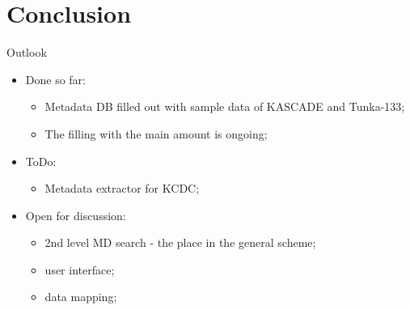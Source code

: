 \section{Conclusion}


\begin{frame}{Outlook}
\begin{itemize}
\item Done so far:
    \begin{itemize}
    \item Metadata DB filled out with sample data of KASCADE and Tunka-133;
    \item The filling with the main amount is ongoing;
    \end{itemize}
\item ToDo: 
    \begin{itemize}
     \item Metadata extractor for KCDC;
    \end{itemize}

\item Open for discussion:
\begin{itemize}
 \item 2nd level MD search - the place in the general scheme;
 \item user interface;
 \item data mapping;
\end{itemize}

 \end{itemize}
\end{frame}

